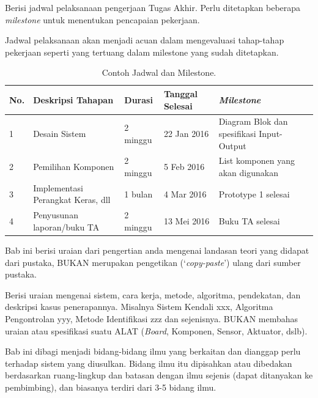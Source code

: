 \documentclass{final_project}
\begin{document}
Berisi jadwal pelaksanaan pengerjaan Tugas Akhir. Perlu ditetapkan beberapa \textit{milestone} untuk menentukan pencapaian pekerjaan.

Jadwal pelaksanaan akan menjadi acuan dalam mengevaluasi tahap-tahap pekerjaan seperti yang tertuang dalam milestone yang sudah ditetapkan.

\begin{table}[!ht]
\centering
\caption{Contoh Jadwal dan Milestone.}
\begin{tabular}{|p{5mm}|p{25mm}|p{20mm}|p{20mm}|p{35mm}|} 
 \hline
 \rowcolor{lightgray}
 \textbf{No.} & \textbf{Deskripsi Tahapan} & \textbf{Durasi} & \textbf{Tanggal Selesai} & \textbf{\textit{Milestone}} \\
 \hline
 1 & Desain Sistem & 2 minggu & 22 Jan 2016 & Diagram Blok dan spesifikasi Input-Output \\ 
 \hline
 2 & Pemilihan Komponen & 2 minggu & 5 Feb 2016 & List komponen yang akan digunakan \\
 \hline
 3 & Implementasi Perangkat Keras, dll & 1 bulan & 4 Mar 2016 & Prototype 1 selesai \\
 \hline
 4 & Penyusunan laporan/buku TA & 2 minggu & 13 Mei 2016 & Buku TA selesai \\
 \hline
\end{tabular}
\label{table:1}
\end{table}


Bab ini berisi uraian dari pengertian anda mengenai landasan teori yang didapat dari pustaka, BUKAN merupakan pengetikan (‘\textit{copy-paste}’) ulang dari sumber pustaka.

Berisi uraian mengenai sistem, cara kerja, metode, algoritma, pendekatan, dan deskripsi kasus penerapannya. Misalnya Sistem Kendali xxx, Algoritma Pengontrolan yyy, Metode Identifikasi zzz dan sejenisnya. BUKAN membahas uraian atau spesifikasi suatu ALAT (\textit{Board}, Komponen, Sensor, Aktuator, dslb). 

Bab ini dibagi menjadi bidang-bidang ilmu yang berkaitan dan dianggap perlu terhadap sistem yang diusulkan. Bidang ilmu itu dipisahkan atau dibedakan berdasarkan ruang-lingkup dan batasan dengan ilmu sejenis (dapat ditanyakan ke pembimbing), dan biasanya terdiri dari 3-5 bidang ilmu. 
\end{document}
